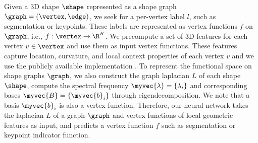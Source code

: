 \label{sec:problem}
Given a 3D shape $\shape$ represented as a shape graph $\graph=(\vertex,\edge)$, we seek for a per-vertex label $l$, such as segmentation or keypoints. These labels are represented as vertex functions $f$ on $\graph$, i.e., $f:\vertex\rightarrow \R^K$. We precompute a set of 3D features for each vertex $v \in \vertex$ and use them as input vertex functions. These features capture location, curvature, and local context properties of each vertex $v$ and we use the publicly available implementation \cite{kim2014shape2pose}. To represent the functional space on shape graphs $\graph$, we also construct the graph laplacian $L$ of each shape $\shape$, compute the spectral frequency $\myvec{\lambda}=\{\lambda_i\}$ and corresponding bases $\myvec{B}=\{\myvec{b}_i\}$ through eigendecomposition. We note that a basis $\myvec{b}_i$ is also a vertex function. Therefore, our neural network takes the laplacian $L$ of a graph $\graph$ and vertex functions of local geometric features as input, and predicts a vertex function $f$ such as segmentation or keypoint indicator function.

\iffalse
\todo{
  \begin{itemize}
    \item given a 3D shape represented as a shape graph, we seek for a per-vertex label, such as segmentation or keypoints. these labels are representated as functions on the shape graph
    \item in order to use a graph CNN for this problem, we have to feed it with a graph with vertex function. 
    \item we precompute a set of 3D features for each point of the shape and use them as the vertex function. these features capture the location, curvature, and local context properties. Refer to CITATION for details.
    \item in order to use spectral CNN, we also construct the graph laplacian of each shape and compute the spectral bases through eigendecomposition. 
    \item therefore, our neural network takes the spectral bases of a graph and a vertex function defined on it as input, and predicts a vertex function of segmentation or keypoints. specifically, the predicted function at each vertex is a one-hot vector. 
  \end{itemize}
}
\fi

